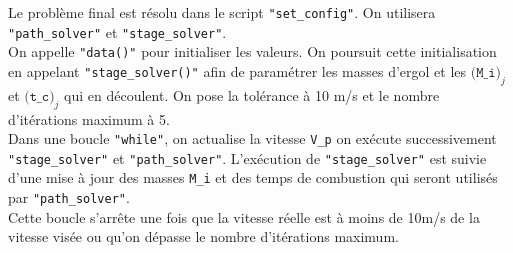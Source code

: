 Le problème final est résolu dans le script \texttt{"set\_config"}. On utilisera \texttt{"path\_solver"} et \texttt{"stage\_solver"}.\\
On appelle \texttt{"data()"} pour initialiser les valeurs. On poursuit cette initialisation en appelant \texttt{"stage\_solver()"} afin de paramétrer les masses d'ergol et les $\texttt{(M\_i)}_j$ et $\texttt{(t\_c)}_j$ qui en découlent. On pose la tolérance à 10 m/s et le nombre d'itérations maximum à 5.\\
Dans une boucle \texttt{"while"}, on actualise la vitesse \texttt{V\_p} on exécute successivement \texttt{"stage\_solver"} et \texttt{"path\_solver"}. L'exécution de \texttt{"stage\_solver"} est suivie d'une mise à jour des masses \texttt{M\_i} et des temps de combustion qui seront utilisés par \texttt{"path\_solver"}.\\
Cette boucle s'arrête une fois que la vitesse réelle est à moins de 10m/s de la vitesse visée ou qu'on dépasse le nombre d'itérations maximum.